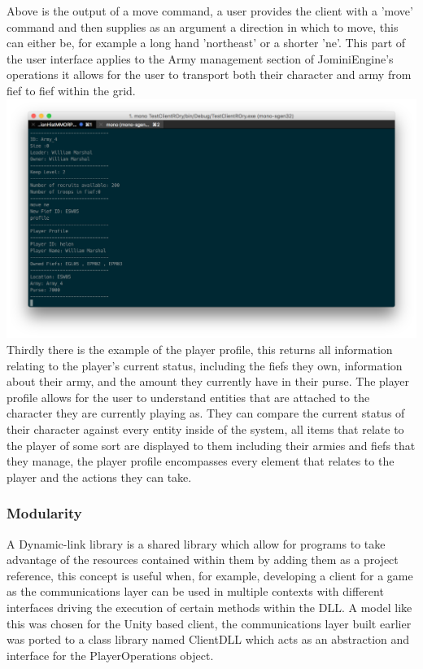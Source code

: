 \documentclass{article}
\begin{document}
Above is the output of a move command, a user provides the client with a 'move' command and then supplies as an argument a direction in which to move, this can either be, for example a long hand 'northeast' or a shorter 'ne'. This part of the user interface applies to the Army management section of JominiEngine's operations it allows for the user to transport both their character and army from fief to fief within the grid.\\
\includegraphics[width=\textwidth]{text5.png}
Thirdly there is the example of the player profile, this returns all information relating to the player's current status, including the fiefs they own, information about their army, and the amount they currently have in their purse. The player profile allows for the user to understand entities that are attached to the character they are currently playing as. They can compare the current status of their character against every entity inside of the system, all items that relate to the player of some sort are displayed to them including their armies and fiefs that they manage, the player profile encompasses every element that relates to the player and the actions they can take.
\subsubsection{Modularity}
A Dynamic-link library is a shared library which allow for programs to take advantage of the resources contained within them by adding them as a project reference, this concept is useful when, for example, developing a client for a game as the communications layer can be used in multiple contexts with different interfaces driving the execution of certain methods within the DLL. A model like this was chosen for the Unity based client, the communications layer built earlier was ported to a class library named ClientDLL which acts as an abstraction and interface for the PlayerOperations object.
\end{document}

